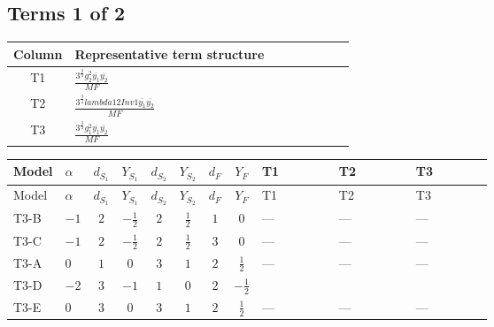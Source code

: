 \documentclass[8pt]{article}
\begin{document}
\begin{landscape}
\subsection*{Terms 1 of 2}
\begin{center}
\begin{tabular}{@{}c >{\raggedright\arraybackslash}p{0.82\linewidth}@{}}
\toprule
Column & Representative term structure \\
\midrule
T1 & \(\displaystyle \frac{3^{\frac{3}{4}} g_{2}^{2} \overline{y_{1}} \overline{y_{2}}}{MF}\) \\
\midrule
T2 & \(\displaystyle \frac{3^{\frac{3}{4}} lambda12Inv1 \overline{y_{1}} \overline{y_{2}}}{MF}\) \\
\midrule
T3 & \(\displaystyle \frac{3^{\frac{3}{4}} g_{1}^{2} \overline{y_{1}} \overline{y_{2}}}{MF}\) \\
\midrule
\bottomrule
\end{tabular}
\end{center}
\smallskip
\tiny
\begin{longtable}{@{}llcccccc >{\raggedright\arraybackslash}p{0.21\linewidth} >{\raggedright\arraybackslash}p{0.21\linewidth} >{\raggedright\arraybackslash}p{0.21\linewidth}@{}}
\toprule
Model & $\alpha$ & $d_{S_1}$ & $Y_{S_1}$ & $d_{S_2}$ & $Y_{S_2}$ & $d_F$ & $Y_F$ & T1 & T2 & T3 \\
\midrule
\endfirsthead
\toprule
Model & $\alpha$ & $d_{S_1}$ & $Y_{S_1}$ & $d_{S_2}$ & $Y_{S_2}$ & $d_F$ & $Y_F$ & T1 & T2 & T3 \\
\midrule
\endhead
T3-B & $-1$ & $2$ & $-\frac{1}{2}$ & $2$ & $\frac{1}{2}$ & $1$ & $0$ & --- & --- & --- \\
\midrule
T3-C & $-1$ & $2$ & $-\frac{1}{2}$ & $2$ & $\frac{1}{2}$ & $3$ & $0$ & --- & --- & --- \\
\midrule
T3-A & $0$ & $1$ & $0$ & $3$ & $1$ & $2$ & $\frac{1}{2}$ & --- & --- & --- \\
\midrule
T3-D & $-2$ & $3$ & $-1$ & $1$ & $0$ & $2$ & $-\frac{1}{2}$ & \scriptsize\adjustbox{max width=\linewidth}{$\begin{gathered} - \frac{11 \cdot 3^{\frac{3}{4}} g_{2}^{2} \overline{y_{1}} \overline{y_{2}}}{8 MF}\end{gathered}$} & \scriptsize\adjustbox{max width=\linewidth}{$\begin{gathered} - \frac{3^{\frac{3}{4}} lambda12Inv1 \overline{y_{1}} \overline{y_{2}}}{6 MF}\end{gathered}$} & \scriptsize\adjustbox{max width=\linewidth}{$\begin{gathered} - \frac{3^{\frac{3}{4}} g_{1}^{2} \overline{y_{1}} \overline{y_{2}}}{8 MF}\end{gathered}$} \\
\midrule
T3-E & $0$ & $3$ & $0$ & $3$ & $1$ & $2$ & $\frac{1}{2}$ & --- & --- & --- \\
\midrule
\bottomrule
\end{longtable}
\clearpage

\end{landscape}
\end{document}
